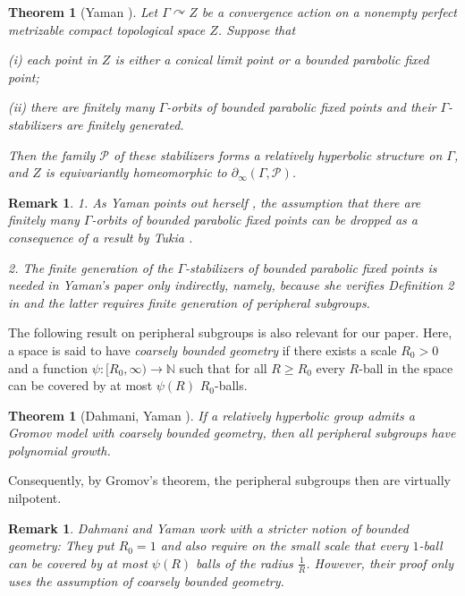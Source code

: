 \documentclass[12pt]{article}
\theoremstyle{boldplain}
\newtheorem{thm}[equation]{Theorem}
\newtheorem{theorem}[equation]{Theorem}
\theoremstyle{bolddefinition}
\newtheorem{rem}[equation]{Remark}
\numberwithin{equation}{section}
\def\N{{\mathbb N}}
\def\Ga{\Gamma}
\def\acts{\curvearrowright}
\def\geo{\partial_{\infty}}
\begin{document}
\begin{thm}
[Yaman \cite{Yaman}]
\label{thm:Yaman} 
Let $\Ga\acts Z$ be a convergence action on 
a nonempty perfect metrizable compact topological space $Z$.
Suppose that 

(i) each point in $Z$ is either a conical limit point or a bounded parabolic fixed point;

(ii) there are finitely many $\Ga$-orbits of bounded parabolic fixed points
and their $\Ga$-stabilizers 
are finitely generated. 

Then the family ${\mathcal P}$ of these stabilizers forms a relatively hyperbolic structure on $\Ga$,
and $Z$ is equivariantly homeomorphic to $\geo(\Ga,{\mathcal P})$. 
\end{thm}

\begin{rem}
1. As Yaman points out herself \cite[pp. 41-42]{Yaman},
the assumption that there are finitely many $\Ga$-orbits of bounded parabolic fixed points
can be dropped
as a consequence of a result by Tukia \cite[Thm 1B]{Tukia_conical}.

{2. The finite generation of the $\Ga$-stabilizers of bounded parabolic fixed points is needed in Yaman's paper \cite{Yaman} only indirectly, namely, because she verifies Definition 2 in \cite{Bowditch2012} and the latter requires finite generation of peripheral subgroups. }
\end{rem}

The following result on peripheral subgroups is also relevant for our paper.
Here, a space is said to have {\em coarsely bounded geometry} 
if there exists a scale $R_0>0$ and a function $\psi: [R_0,\infty)\to\N$ 
such that for all $R\geq R_0$ every $R$-ball in the space can be covered by at most $\psi(R)$ $R_0$-balls.

\begin{theorem}
[Dahmani, Yaman \cite{DY}] 
\label{thm:DY}
If a  relatively hyperbolic group 
admits a Gromov model 
with coarsely  bounded geometry, 
then all peripheral subgroups 
have polynomial growth.
\end{theorem}
Consequently,
by Gromov's theorem,
the peripheral subgroups then are virtually nilpotent. 

\begin{rem}
Dahmani and Yaman work with a stricter notion of bounded geometry:
They put $R_0=1$ and also require on the small scale that 
every $1$-ball can be covered by at most $\psi(R)$ balls of the radius $\frac{1}{R}$.
However, their proof only uses the assumption of coarsely bounded geometry.
\end{rem}
\end{document}
